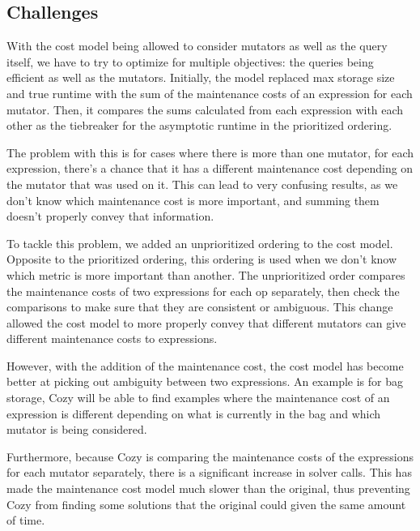 \subsection{Challenges}
With the cost model being allowed to consider mutators as well as the query
itself, we have to try to optimize for multiple objectives: the queries being
efficient as well as the mutators. Initially, the model replaced max storage
size and true runtime with the sum of the maintenance costs of an expression for
each mutator. Then, it compares the sums calculated from each expression with
each other as the tiebreaker for the asymptotic runtime in the prioritized
ordering.

The problem with this is for cases where there is more than one mutator, for
each expression, there's a chance that it has a different maintenance cost
depending on the mutator that was used on it. This can lead to very confusing
results, as we don't know which maintenance cost is more important, and summing
them doesn't properly convey that information.

To tackle this problem, we added an unprioritized ordering to the cost model.
Opposite to the prioritized ordering, this ordering is used when we don't know
which metric is more important than another. The unprioritized order compares
the maintenance costs of two expressions for each op separately, then check the
comparisons to make sure that they are consistent or ambiguous. This change
allowed the cost model to more properly convey that different mutators can give
different maintenance costs to expressions.

However, with the addition of the maintenance cost, the cost model has become
better at picking out ambiguity between two expressions. An example is for bag
storage, Cozy will be able to find examples where the maintenance cost of an
expression is different depending on what is currently in the bag and which
mutator is being considered.

Furthermore, because Cozy is comparing the maintenance costs of the expressions
for each mutator separately, there is a significant increase in solver calls.
This has made the maintenance cost model much slower than the original, thus
preventing Cozy from finding some solutions that the original could given the
same amount of time.
